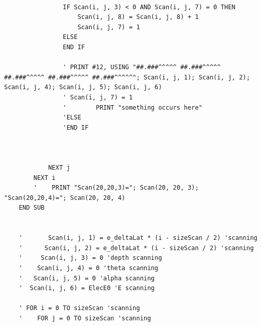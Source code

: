 \documentclass[10pt, reqno]{exam}
\begin{document}
\begin{verbatim}
    
                IF Scan(i, j, 3) < 0 AND Scan(i, j, 7) = 0 THEN
                    Scan(i, j, 8) = Scan(i, j, 8) + 1
                    Scan(i, j, 7) = 1
                ELSE
                END IF
    
                ' PRINT #12, USING "##.###^^^^^ ##.###^^^^^ ##.###^^^^^ ##.###^^^^^ ##.###^^^^^"; Scan(i, j, 1); Scan(i, j, 2); Scan(i, j, 4); Scan(i, j, 5); Scan(i, j, 6)
                ' Scan(i, j, 7) = 1
                '        PRINT "something occurs here"
                'ELSE
                'END IF
    
    
    
            NEXT j
        NEXT i
        '    PRINT "Scan(20,20,3)="; Scan(20, 20, 3); "Scan(20,20,4)="; Scan(20, 20, 4)
    END SUB
    
    
    '       Scan(i, j, 1) = e_deltaLat * (i - sizeScan / 2) 'scanning
    '      Scan(i, j, 2) = e_deltaLat * (i - sizeScan / 2) 'scanning
    '     Scan(i, j, 3) = 0 'depth scanning
    '    Scan(i, j, 4) = 0 'theta scanning
    '   Scan(i, j, 5) = 0 'alpha scanning
    '  Scan(i, j, 6) = ElecE0 'E scanning
    
    ' FOR i = 0 TO sizeScan 'scanning
    '    FOR j = 0 TO sizeScan 'scanning
\end{verbatim}
\end{document}
